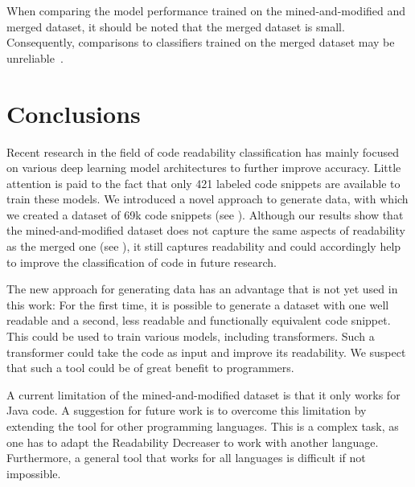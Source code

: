 \documentclass[%
class=scrreprt,
chapterprefix=false,%
open=right,%
twoside=false,%
paper=a4,%
logofile={Logo\_zentral\_farbig\_EN.png},%
thesistype=master,%
UKenglish,%
]{se2thesis}
\theoremstyle{definition}
\newcommand{\numSamples}{69k\xspace}
\newcommand{\RDH}{Readability Decreaser\xspace}
\begin{document}
	When comparing the model performance trained on the mined-and-modified and merged dataset, it should be noted that the merged dataset is small. Consequently, comparisons to classifiers trained on the merged dataset may be unreliable~\cite{mi2022towards}.
	
\section{Conclusions} \label{Conclusions}
	Recent research in the field of code readability classification has mainly focused on various deep learning model architectures to further improve accuracy. Little attention is paid to the fact that only 421 labeled code snippets are available to train these models. We introduced a novel approach to generate data, with which we created a dataset of \numSamples code snippets (see ). Although our results show that the  mined-and-modified dataset does not capture the same aspects of readability as the merged one (see ), it still captures readability and could accordingly help to improve the classification of code in future research.
	
	The new approach for generating data has an advantage that is not yet used in this work: For the first time, it is possible to generate a dataset with one well readable and a second, less readable and functionally equivalent code snippet. This could be used to train various models, including transformers. Such a transformer could take the code as input and improve its readability. We suspect that such a tool could be of great benefit to programmers.
	
	A current limitation of the mined-and-modified dataset is that it only works for Java code. A suggestion for future work is to overcome this limitation by extending the tool for other programming languages. This is a complex task, as one has to adapt the \RDH to work with another language. Furthermore, a general tool that works for all languages is difficult if not impossible.
	
	
\end{document}
